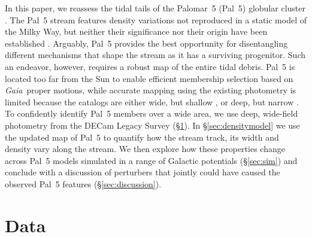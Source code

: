 \documentclass[twocolumn]{aastex62}
\newcommand{\gaia}{\textsl{Gaia}}
\begin{document}
In this paper, we reassess the tidal tails of the Palomar~5 (Pal~5) globular cluster \citep{Odenkirchen:2001, Rockosi:2002}.
The Pal~5 stream features density variations not reproduced in a static model of the Milky Way, but neither their significance nor their origin have been established \citep{Carlberg:2012, Bernard:2016, Ibata:2016, Erkal:2017}.
Arguably, Pal~5 provides the best opportunity for disentangling different mechanisms that shape the stream as it has a surviving progenitor. Such an endeavor, however, requires a robust map of the entire tidal debris.
Pal~5 is located too far from the Sun to enable efficient membership selection based on \gaia\ proper motions, while accurate mapping using the existing photometry is limited because the catalogs are either wide, but shallow \citep{Bernard:2016}, or deep, but narrow \citep{Ibata:2016}.
To confidently identify Pal~5 members over a wide area, we use deep, wide-field photometry from the DECam Legacy Survey (\S\ref{sec:data}).
In \S\ref{sec:densitymodel} we use the updated map of Pal~5 to quantify how the stream track, its width and density vary along the stream.
We then explore how these properties change across Pal~5 models simulated in a range of Galactic potentials (\S\ref{sec:sim}) and conclude with a discussion of perturbers that jointly could have caused the observed Pal~5 features (\S\ref{sec:discussion}).


\section{Data}
\label{sec:data}
\end{document}
